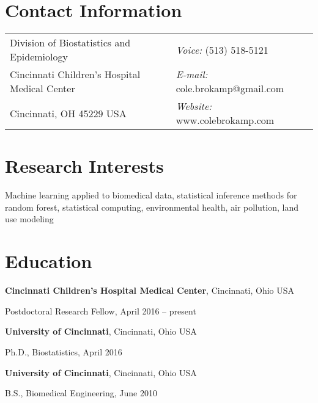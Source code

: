 \documentclass[margin,line]{res}
\newenvironment{list1}{
  \begin{list}{\ding{113}}{%
      \setlength{\itemsep}{0in}
      \setlength{\parsep}{0in} \setlength{\parskip}{0in}
      \setlength{\topsep}{0in} \setlength{\partopsep}{0in} 
      \setlength{\leftmargin}{0.17in}}}{\end{list}}
\begin{document}

\begin{resume}
\section{\sc Contact Information}
\vspace{.05in}
\begin{tabular}{@{}p{3in}p{4in}}      
Division of Biostatistics and Epidemiology & {\it Voice:}  (513) 518-5121 \\         
Cincinnati Children's Hospital Medical Center & {\it E-mail:}  cole.brokamp@gmail.com\\       
Cincinnati, OH 45229 USA  & {\it Website:} www.colebrokamp.com \\     
\end{tabular}


\section{\sc Research Interests}
Machine learning applied to biomedical data, statistical inference methods for random forest,
statistical computing, environmental health, air pollution, land use modeling

\section{\sc Education}

{\bf Cincinnati Children's Hospital Medical Center}, Cincinnati, Ohio USA \\
\vspace*{-.1in}
\begin{list1}
    \item[]Postdoctoral Research Fellow, April 2016 -- present
\end{list1}

{\bf University of Cincinnati}, Cincinnati, Ohio USA \\
\vspace*{-.1in}
\begin{list1}
\item[]Ph.D., Biostatistics, April 2016
\end{list1}

{\bf University of Cincinnati}, Cincinnati, Ohio USA\\
\vspace*{-.1in}
\begin{list1}
\item[]B.S., Biomedical Engineering,  June 2010
\end{list1}



\end{resume}
\end{document}
